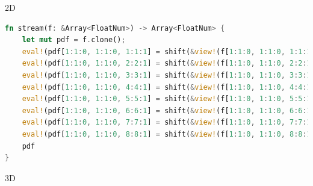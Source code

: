 2D \\

\begin{lstlisting}[language=Rust, caption=Streaming with \texttt{shift} function for two dimensions with 9 discrete speeds (D2Q9)., label=rust-streaming-2d]
fn stream(f: &Array<FloatNum>) -> Array<FloatNum> {
	let mut pdf = f.clone();
	eval!(pdf[1:1:0, 1:1:0, 1:1:1] = shift(&view!(f[1:1:0, 1:1:0, 1:1:1]), &[1, 0, 0, 0]));
	eval!(pdf[1:1:0, 1:1:0, 2:2:1] = shift(&view!(f[1:1:0, 1:1:0, 2:2:1]), &[0, 1, 0, 0]));
	eval!(pdf[1:1:0, 1:1:0, 3:3:1] = shift(&view!(f[1:1:0, 1:1:0, 3:3:1]), &[-1, 0, 0, 0]));
	eval!(pdf[1:1:0, 1:1:0, 4:4:1] = shift(&view!(f[1:1:0, 1:1:0, 4:4:1]), &[0, -1, 0, 0]));
	eval!(pdf[1:1:0, 1:1:0, 5:5:1] = shift(&view!(f[1:1:0, 1:1:0, 5:5:1]), &[1, 1, 0, 0]));
	eval!(pdf[1:1:0, 1:1:0, 6:6:1] = shift(&view!(f[1:1:0, 1:1:0, 6:6:1]), &[-1, 1, 0, 0]));
	eval!(pdf[1:1:0, 1:1:0, 7:7:1] = shift(&view!(f[1:1:0, 1:1:0, 7:7:1]), &[-1, -1, 0, 0]));
	eval!(pdf[1:1:0, 1:1:0, 8:8:1] = shift(&view!(f[1:1:0, 1:1:0, 8:8:1]), &[1, -1, 0, 0]));
	pdf
}
\end{lstlisting}


3D \\

